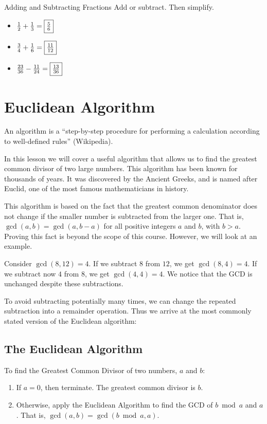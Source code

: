 \documentclass[a4paper,10pt]{report}
\begin{document}
\begin{problem}{Adding and Subtracting Fractions}
 Add or subtract. Then simplify.

 \begin{itemize}
  \item $\frac{1}{2} + \frac{1}{3} = \Ans{\frac{5}{6}}$
  \item $\frac{3}{4} + \frac{1}{6} = \Ans{\frac{11}{12}}$
  \item $\frac{23}{36} - \frac{11}{24} = \Ans{\frac{13}{36}}$
 \end{itemize}
\end{problem}

\section{Euclidean Algorithm}

An \gls{algorithm} is a ``step-by-step procedure for performing a calculation
according to well-defined rules'' (Wikipedia).

In this lesson we will cover a useful algorithm that allows us to find the
greatest common divisor of two large numbers. This algorithm has been known for
thousands of years. It was discovered by the Ancient Greeks, and is named after
Euclid, one of the most famous mathematicians in history.

This algorithm is based on the fact that the greatest common denominator does
not change if the smaller number is subtracted from the larger one. That is,
$\gcd(a, b) = \gcd(a, b - a)$ for all positive integers $a$ and $b$, with $b>a$.
Proving this fact is beyond the scope of this course. However, we will look at
an example.

Consider $\gcd(8, 12)=4$. If we subtract $8$ from $12$, we get $\gcd(8, 4)=4$.
If we subtract now $4$ from $8$, we get $\gcd(4, 4)=4$. We notice that the GCD
is unchanged despite these subtractions.

To avoid subtracting potentially many times, we can change the repeated
subtraction into a remainder operation. Thus we arrive at the most commonly
stated version of the Euclidean algorithm:

\subsection{The Euclidean Algorithm}

To find the Greatest Common Divisor of two numbers, $a$ and $b$:
\begin{enumerate}
 \item If $a=0$, then terminate. The greatest common divisor is $b$.
 \item Otherwise, apply the Euclidean Algorithm to find the GCD of $b \bmod a$
 and $a$. That is, $\gcd(a, b) = \gcd(b \bmod a, a)$.
\end{enumerate}
\end{document}
